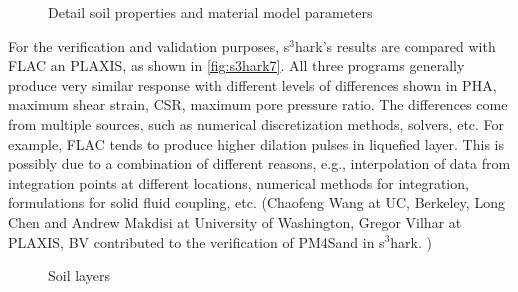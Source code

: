 \begin{figure}[!htbp]
  \centering 
    
  \caption{Detail soil properties and material model parameters}
  \label{fig:s3hark6}
\end{figure}

For the verification and validation purposes, s$^3$hark's results are compared with FLAC an PLAXIS, as shown in \autoref{fig:s3hark7}. 
All three programs generally produce very similar response with
different levels of differences shown in PHA, maximum shear strain, CSR, maximum pore pressure ratio. 
The differences come from multiple sources, such as numerical discretization methods, solvers, etc.
For example, FLAC tends to produce higher dilation pulses in liquefied layer. 
This is possibly due to a combination of different reasons, e.g.,
interpolation of data from integration points at different
locations, numerical methods for integration, formulations for
solid fluid coupling, etc.
(Chaofeng Wang at UC, Berkeley, Long Chen and Andrew Makdisi at University of Washington,  
Gregor Vilhar at PLAXIS, BV contributed to the verification of PM4Sand in s$^3$hark. )

\begin{figure}[!htbp]
  \caption{Soil layers }
  \label{fig:s3hark7}
\end{figure}

